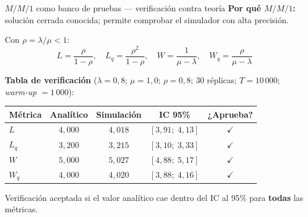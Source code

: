 \documentclass[aspectratio=1610, 10pt]{beamer}
\begin{document}
\begin{frame}{$M/M/1$ como banco de pruebas — verificación contra teoría}
  \footnotesize
  \textbf{Por qué $M/M/1$:} solución cerrada conocida; permite comprobar el
  simulador con alta precisión.

  \vspace{2pt}
  \begin{formulabox}
    \footnotesize
    Con $\rho=\lambda/\mu<1$:
    \[
      L=\frac{\rho}{1-\rho},\quad
      L_q=\frac{\rho^2}{1-\rho},\quad
      W=\frac{1}{\mu-\lambda},\quad
      W_q=\frac{\rho}{\mu-\lambda}
    \]
  \end{formulabox}

  \vspace{4pt}
  \textbf{Tabla de verificación} ($\lambda=0{,}8$; $\mu=1{,}0$; $\rho=0{,}8$;
  30 réplicas; $T=10\,000$; \emph{warm-up} $=1\,000$):
  \begin{center}\scriptsize
    \renewcommand{\arraystretch}{1.25}
    \begin{tabular}{lcccc}
      \toprule
      \textbf{Métrica} & \textbf{Analítico} & \textbf{Simulación}
        & \textbf{IC 95\%} & \textbf{¿Aprueba?} \\
      \midrule
      $L$    & $4{,}000$ & $4{,}018$ & $[3{,}91;\;4{,}13]$ & \textcolor{deepgreen}{$\checkmark$} \\
      $L_q$  & $3{,}200$ & $3{,}215$ & $[3{,}10;\;3{,}33]$ & \textcolor{deepgreen}{$\checkmark$} \\
      $W$    & $5{,}000$ & $5{,}027$ & $[4{,}88;\;5{,}17]$ & \textcolor{deepgreen}{$\checkmark$} \\
      $W_q$  & $4{,}000$ & $4{,}020$ & $[3{,}88;\;4{,}16]$ & \textcolor{deepgreen}{$\checkmark$} \\
      \bottomrule
    \end{tabular}
  \end{center}

  \vspace{2pt}
  \begin{notabox}
    \footnotesize
    Verificación aceptada si el valor analítico cae dentro del IC al 95\% para
    \textbf{todas} las métricas.
  \end{notabox}
\end{frame}
\end{document}
